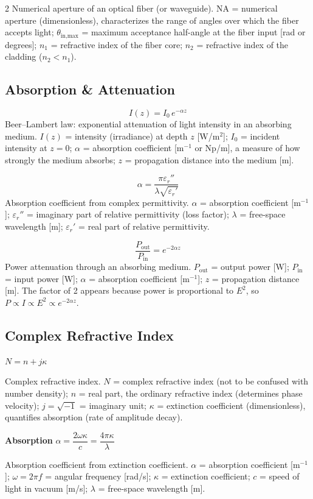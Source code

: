 \documentclass[9pt]{extarticle}
\newcommand{\eqlabel}[1]{\textbf{\scriptsize #1}\;}
\newcommand{\desc}[1]{{\small\color{desc}#1}}
\begin{document}
\begin{multicols}{2}
\desc{Numerical aperture of an optical fiber (or waveguide). NA = numerical aperture (dimensionless), characterizes the range of angles over which the fiber accepts light; $\theta_{\text{in,max}}$ = maximum acceptance half-angle at the fiber input [rad or degrees]; $n_1$ = refractive index of the fiber core; $n_2$ = refractive index of the cladding ($n_2 < n_1$).}

\subsection{Absorption \& Attenuation}
\[I(z) = I_0\,e^{-\alpha z}\]
\desc{Beer--Lambert law: exponential attenuation of light intensity in an absorbing medium. $I(z)$ = intensity (irradiance) at depth $z$ [W/m$^2$]; $I_0$ = incident intensity at $z = 0$; $\alpha$ = absorption coefficient [m$^{-1}$ or Np/m], a measure of how strongly the medium absorbs; $z$ = propagation distance into the medium [m].}

\[\alpha = \frac{\pi\varepsilon_r''}{\lambda\sqrt{\varepsilon_r'}}\]
\desc{Absorption coefficient from complex permittivity. $\alpha$ = absorption coefficient [m$^{-1}$]; $\varepsilon_r''$ = imaginary part of relative permittivity (loss factor); $\lambda$ = free-space wavelength [m]; $\varepsilon_r'$ = real part of relative permittivity.}

\[\frac{P_{\text{out}}}{P_{\text{in}}} = e^{-2\alpha z}\]
\desc{Power attenuation through an absorbing medium. $P_{\text{out}}$ = output power [W]; $P_{\text{in}}$ = input power [W]; $\alpha$ = absorption coefficient [m$^{-1}$]; $z$ = propagation distance [m]. The factor of 2 appears because power is proportional to $E^2$, so $P \propto I \propto E^2 \propto e^{-2\alpha z}$.}

\subsection{Complex Refractive Index}
$N = n + j\kappa$

\desc{Complex refractive index. $N$ = complex refractive index (not to be confused with number density); $n$ = real part, the ordinary refractive index (determines phase velocity); $j = \sqrt{-1}$ = imaginary unit; $\kappa$ = extinction coefficient (dimensionless), quantifies absorption (rate of amplitude decay).}

\eqlabel{Absorption} $\alpha = \dfrac{2\omega\kappa}{c} = \dfrac{4\pi\kappa}{\lambda}$

\desc{Absorption coefficient from extinction coefficient. $\alpha$ = absorption coefficient [m$^{-1}$]; $\omega = 2\pi f$ = angular frequency [rad/s]; $\kappa$ = extinction coefficient; $c$ = speed of light in vacuum [m/s]; $\lambda$ = free-space wavelength [m].}


\end{multicols}
\end{document}

